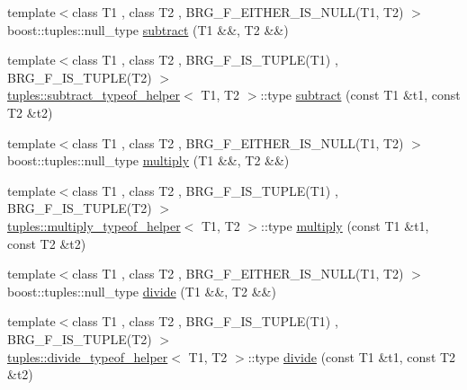 \begin{DoxyCompactItemize}
\item 
{\footnotesize template$<$class T1 , class T2 , B\+R\+G\+\_\+\+F\+\_\+\+E\+I\+T\+H\+E\+R\+\_\+\+I\+S\+\_\+\+N\+U\+L\+L(\+T1, T2) $>$ }\\boost\+::tuples\+::null\+\_\+type \hyperlink{namespaceIceBRG_ae47ad1ad601f3c2f4e6b20fbe3e7006f}{subtract} (T1 \&\&, T2 \&\&)
\item 
{\footnotesize template$<$class T1 , class T2 , B\+R\+G\+\_\+\+F\+\_\+\+I\+S\+\_\+\+T\+U\+P\+L\+E(\+T1) , B\+R\+G\+\_\+\+F\+\_\+\+I\+S\+\_\+\+T\+U\+P\+L\+E(\+T2) $>$ }\\\hyperlink{namespaceIceBRG_1_1tuples_structIceBRG_1_1tuples_1_1subtract__typeof__helper}{tuples\+::subtract\+\_\+typeof\+\_\+helper}$<$ T1, T2 $>$\+::type \hyperlink{namespaceIceBRG_a26622f7657144b52b7d18be7033fe5f2}{subtract} (const T1 \&t1, const T2 \&t2)
\item 
{\footnotesize template$<$class T1 , class T2 , B\+R\+G\+\_\+\+F\+\_\+\+E\+I\+T\+H\+E\+R\+\_\+\+I\+S\+\_\+\+N\+U\+L\+L(\+T1, T2) $>$ }\\boost\+::tuples\+::null\+\_\+type \hyperlink{namespaceIceBRG_ab535c998baac3ffc8412fdbae750b7d1}{multiply} (T1 \&\&, T2 \&\&)
\item 
{\footnotesize template$<$class T1 , class T2 , B\+R\+G\+\_\+\+F\+\_\+\+I\+S\+\_\+\+T\+U\+P\+L\+E(\+T1) , B\+R\+G\+\_\+\+F\+\_\+\+I\+S\+\_\+\+T\+U\+P\+L\+E(\+T2) $>$ }\\\hyperlink{namespaceIceBRG_1_1tuples_structIceBRG_1_1tuples_1_1multiply__typeof__helper}{tuples\+::multiply\+\_\+typeof\+\_\+helper}$<$ T1, T2 $>$\+::type \hyperlink{namespaceIceBRG_ad579274ad3c2e2455f1116bfdcf7544a}{multiply} (const T1 \&t1, const T2 \&t2)
\item 
{\footnotesize template$<$class T1 , class T2 , B\+R\+G\+\_\+\+F\+\_\+\+E\+I\+T\+H\+E\+R\+\_\+\+I\+S\+\_\+\+N\+U\+L\+L(\+T1, T2) $>$ }\\boost\+::tuples\+::null\+\_\+type \hyperlink{namespaceIceBRG_ab43969c262e2747108975f52fc9b47fd}{divide} (T1 \&\&, T2 \&\&)
\item 
{\footnotesize template$<$class T1 , class T2 , B\+R\+G\+\_\+\+F\+\_\+\+I\+S\+\_\+\+T\+U\+P\+L\+E(\+T1) , B\+R\+G\+\_\+\+F\+\_\+\+I\+S\+\_\+\+T\+U\+P\+L\+E(\+T2) $>$ }\\\hyperlink{namespaceIceBRG_1_1tuples_structIceBRG_1_1tuples_1_1divide__typeof__helper}{tuples\+::divide\+\_\+typeof\+\_\+helper}$<$ T1, T2 $>$\+::type \hyperlink{namespaceIceBRG_a08411d216e202daf8f5bd9ff54065b3e}{divide} (const T1 \&t1, const T2 \&t2)
\item 

\end{DoxyCompactItemize}
